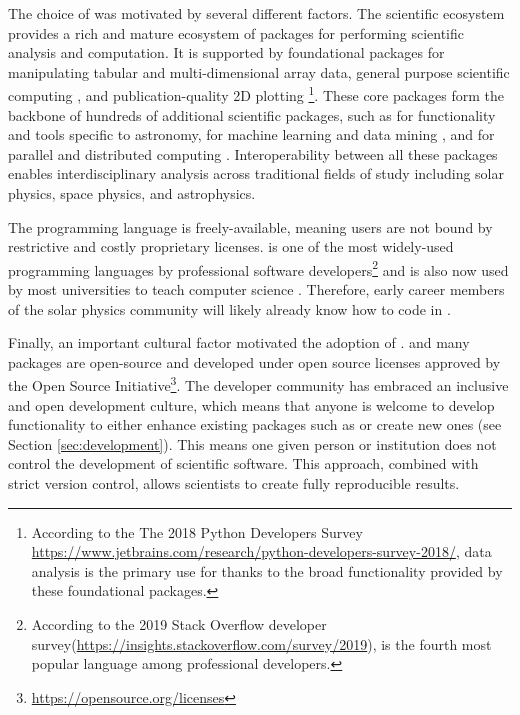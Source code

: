 The choice of \python was motivated by several different factors.
The scientific \python ecosystem provides a rich and mature ecosystem of packages for performing scientific analysis and computation.
It is supported by foundational packages for manipulating tabular \citep[\pandaspkg,][]{pandas} and multi-dimensional array \citep[\numpypkg,][]{numpy} data, general purpose scientific computing \citep[\scipypkg,][]{scipy}, and publication-quality 2D plotting \citep[\matplotlibpkg,][]{matplotlib}\footnote{According to the The 2018 Python Developers Survey \url{https://www.jetbrains.com/research/python-developers-survey-2018/}, data analysis is the primary use for \python thanks to the broad functionality provided by these foundational packages.}.
These core packages form the backbone of hundreds of additional scientific \python packages, such as \astropypkg for functionality and tools specific to astronomy,  for machine learning and data mining \citep{pedregosa11}, and  for parallel and distributed computing \citep{rocklin15}.
Interoperability between all these packages enables interdisciplinary analysis across traditional fields of study including solar physics, space physics, and astrophysics.

The \python programming language is freely-available, meaning users are not bound by restrictive and costly proprietary licenses.
\python is one of the most widely-used programming languages by professional software developers\footnote{According to the 2019 Stack Overflow developer survey(\url{https://insights.stackoverflow.com/survey/2019}), \python is the fourth most popular language among professional developers.} and is also now used by most universities to teach computer science \citep{guo2014}.
Therefore, early career members of the solar physics community will likely already know how to code in \python.

Finally, an important cultural factor motivated the adoption of \python.
\python and many \python packages are open-source and developed under open source licenses approved by the Open Source Initiative\footnote{\url{https://opensource.org/licenses}}.
The \python developer community has embraced an inclusive and open development culture, which means that anyone is welcome to develop functionality to either enhance existing packages such as \sunpypkg or create new ones (see Section \ref{sec:development}).
This means one given person or institution does not control the development of scientific \python software.
This approach, combined with strict version control, allows scientists to create fully reproducible results.

